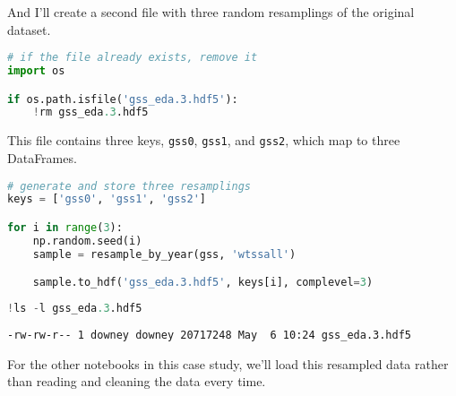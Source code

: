 And I'll create a second file with three random resamplings of the
original dataset.

\begin{lstlisting}[language=Python,style=source]
# if the file already exists, remove it
import os

if os.path.isfile('gss_eda.3.hdf5'):
    !rm gss_eda.3.hdf5
\end{lstlisting}

This file contains three keys, \passthrough{\lstinline!gss0!},
\passthrough{\lstinline!gss1!}, and \passthrough{\lstinline!gss2!},
which map to three DataFrames.

\begin{lstlisting}[language=Python,style=source]
# generate and store three resamplings
keys = ['gss0', 'gss1', 'gss2']

for i in range(3):
    np.random.seed(i)
    sample = resample_by_year(gss, 'wtssall')

    sample.to_hdf('gss_eda.3.hdf5', keys[i], complevel=3)
\end{lstlisting}

\begin{lstlisting}[language=Python,style=source]
!ls -l gss_eda.3.hdf5
\end{lstlisting}

\begin{lstlisting}[style=output]
-rw-rw-r-- 1 downey downey 20717248 May  6 10:24 gss_eda.3.hdf5
\end{lstlisting}

For the other notebooks in this case study, we'll load this resampled
data rather than reading and cleaning the data every time.

